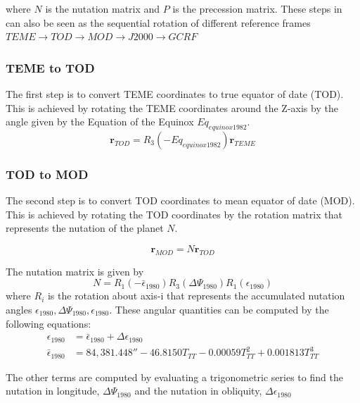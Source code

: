 \documentclass[12pt,letterpaper]{paper}
\begin{document}
where $N$ is the nutation matrix and $P$ is the precession matrix. These steps in can also be seen as the sequential rotation of different reference frames $TEME \rightarrow TOD \rightarrow MOD \rightarrow J2000 \rightarrow GCRF $

\subsubsection{TEME to TOD}
The first step is to convert TEME coordinates to true equator of date (TOD). This is achieved by rotating the TEME coordinates around the Z-axis by the angle given by the Equation of the Equinox $Eq_{equinox1982}$.
\begin{equation}
\mathbf{r}_{TOD} = R_3(-Eq_{equinox1982}) \mathbf{r}_{TEME}
\end{equation}



\subsubsection{TOD to MOD}
The second step is to convert TOD coordinates to mean equator of date (MOD). This is achieved by rotating the TOD coordinates by the rotation matrix that represents the nutation of the planet $N$. 

\begin{equation}
\mathbf{r}_{MOD} = N \mathbf{r}_{TOD}
\end{equation}

The nutation matrix is given by
\begin{equation}
N = R_1(- \bar{\epsilon}_{1980})R_3(\Delta\Psi_{1980})R_1(\epsilon_{1980})
\end{equation}
where $R_i$ is the rotation about axis-i that represents the accumulated nutation angles $\epsilon_{1980}, \Delta\Psi_{1980}, \epsilon_{1980}$. These angular quantities can be computed by the following equations:
\begin{align}
\epsilon_{1980} &= \bar{\epsilon}_{1980} + \Delta \epsilon_{1980} \\
\bar{\epsilon}_{1980} &= 84,381.448'' - 46.8150T_{TT} - 0.00059T^2_{TT} + 0.001813 T^3_{TT}
\end{align}

The other terms are computed by evaluating a trigonometric series to find the nutation in longitude, $\Delta\Psi_{1980}$ and the nutation in obliquity,  $\Delta \epsilon_{1980}$
\end{document}
